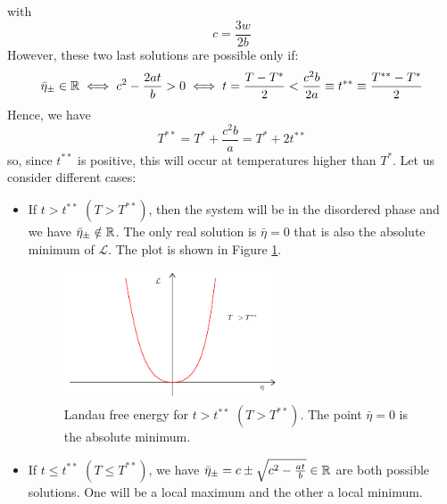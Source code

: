 \documentclass[../main/main.tex]{subfiles}
\begin{document}
with
\begin{equation*}
  c = \frac{3w}{2b}
\end{equation*}
However, these two last solutions are possible only if:
\begin{equation*}
  \bar{\eta }_{\pm} \in \mathbb{R} \iff c^2 - \frac{2at}{b}>0  \iff t = \frac{T-T^*}{2} < \frac{c^2 b}{2a} \equiv t^{**} \equiv  \frac{T^{**}-T^*}{2}
\end{equation*}
Hence, we have
\begin{equation*}
  T^{**} = T^* + \frac{c^2b}{a} = T^* + 2t^{**}
\end{equation*}
so, since \( t^{**} \) is positive, this will occur at temperatures higher than \( T^* \).
Let us consider different cases:
\begin{itemize}
\item If \( t> t^{**} \) \( ( T > T^ {**}) \), then the system will be in the disordered phase and we have  \( \bar{\eta }_\pm \notin \mathbb{R}  \). The only real solution is \( \bar{\eta }=0  \) that is also the absolute minimum of \( \mathcal{L} \). The plot is shown in Figure \ref{fig:16_1}.
\begin{figure}[h!]
\centering
\includegraphics[width=0.6\textwidth]{../lessons/16_image/1.pdf}
\caption{\label{fig:16_1} Landau free energy for \( t> t^{**} \) \( ( T > T^ {**}) \). The point \( \bar{\eta }=0  \) is the absolute minimum.}
\end{figure}


\item If \( t \le t^{**} \) \( ( T \le T^ {**}) \), we have \( \bar{\eta }_\pm = c \pm \sqrt{c^2 - \frac{at}{b}} \in \mathbb{R}  \) are both possible solutions. One will be a local maximum and the other a local minimum.


\end{itemize}
\end{document}
